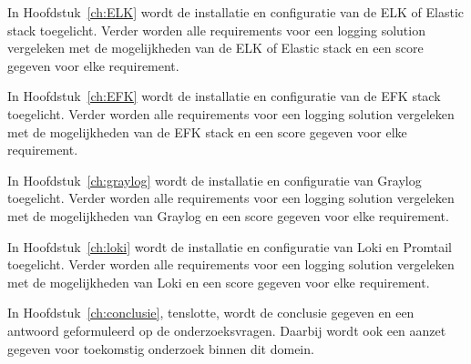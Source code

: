 In Hoofdstuk~\ref{ch:ELK} wordt de installatie en configuratie van de ELK of Elastic stack toegelicht. Verder worden alle requirements voor een logging solution vergeleken met de mogelijkheden van de ELK of Elastic stack en een score gegeven voor elke requirement.

In Hoofdstuk~\ref{ch:EFK} wordt de installatie en configuratie van de EFK stack toegelicht. Verder worden alle requirements voor een logging solution vergeleken met de mogelijkheden van de EFK stack en een score gegeven voor elke requirement.

In Hoofdstuk~\ref{ch:graylog} wordt de installatie en configuratie van Graylog toegelicht. Verder worden alle requirements voor een logging solution vergeleken met de mogelijkheden van Graylog en een score gegeven voor elke requirement.

In Hoofdstuk~\ref{ch:loki} wordt de installatie en configuratie van Loki en Promtail toegelicht. Verder worden alle requirements voor een logging solution vergeleken met de mogelijkheden van Loki en een score gegeven voor elke requirement.

In Hoofdstuk~\ref{ch:conclusie}, tenslotte, wordt de conclusie gegeven en een antwoord geformuleerd op de onderzoeksvragen. Daarbij wordt ook een aanzet gegeven voor toekomstig onderzoek binnen dit domein.

